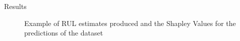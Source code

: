 \documentclass[final, 12pt]{beamer}
\newlength{\colwidth}
\newlength{\bigcolwidth}
\begin{document}
\begin{frame}[t]
\begin{columns}[t]
\begin{column}{\bigcolwidth}
\begin{block}{Results}
        \begin{figure}
            \centering
            \qquad
            \caption{Example of RUL estimates produced and the Shapley Values for the predictions of the dataset}
        \end{figure}


\end{block}
\end{column}
\end{columns}
\end{frame}
\end{document}
